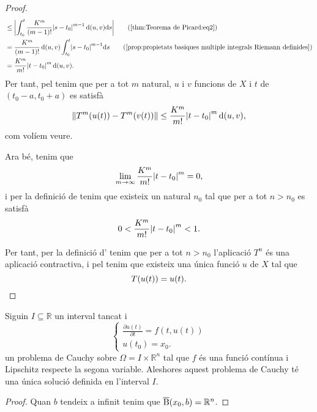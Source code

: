 \documentclass[../Apunts.tex]{subfiles}
\begin{document}
\begin{theorem}
\begin{proof}
\begin{align*}
				&\leq\abs{\int_{t_{0}}^{t}\frac{K^{m}}{(m-1)!}\abs{s-t_{0}}^{m-1}\distancia(u,v)\diff s}\tag{\ref{thm:Teorema de Picard:eq2}}\\
				&=\frac{K^{m}}{(m-1)!}\distancia(u,v)\int_{t_{0}}^{t}\abs{s-t_{0}}^{m-1}\diff s\tag{\ref{prop:propietats basiques multiple integrals Riemann definides}}\\
				&=\frac{K^{m}}{m!}\abs{t-t_{0}}^{m}\distancia(u,v).%
			\end{align*}
			Per tant, pel  tenim que per a tot \(m\) natural, \(u\) i \(v\) funcions de \(X\) i \(t\) de \((t_{0}-a,t_{0}+a)\) es satisfà
			\[\norm{T^{m}(u(t))-T^{m}(v(t))}\leq\frac{K^{m}}{m!}\abs{t-t_{0}}^{m}\distancia(u,v),\]
			com volíem veure.
			
			Ara bé, tenim que
			\[\lim_{m\to\infty}\frac{K^{m}}{m!}\abs{t-t_{0}}^{m}=0,\]%
			i per la definició de  tenim que existeix un natural \(n_{0}\) tal que per a tot \(n>n_{0}\) es satisfà
			\[0<{\frac{K^{m}}{m!}\abs{t-t_{0}}^{m}}<1.\]
			
			Per tant, per la definició d' tenim que per a tot \(n>n_{0}\) l'aplicació \(T^{n}\) és una aplicació contractiva, i pel \corollari{}  tenim que existeix una única funció \(u\) de \(X\) tal que
			\[T(u(t))=u(t).\qedhere\]
		\end{proof}
	\end{theorem}
	\begin{corollary}
		\label{cor:Teorema de Picard}
		Siguin \(I\subseteq\mathbb{R}\) un interval tancat i
		\[\begin{cases}
			\displaystyle \frac{\partial u(t)}{\partial t}=f(t,u(t)) \\
			\displaystyle u(t_{0})=x_{0}.
		\end{cases}\]
		un problema de Cauchy sobre \(\Omega=I\times\mathbb{R}^{n}\) tal que \(f\) és una funció contínua i Lipschitz respecte la segona variable. Aleshores aquest problema de Cauchy té una única solució definida en l'interval \(I\).
		\begin{proof}
			Quan \(b\) tendeix a infinit tenim que \(\overline{\operatorname{B}}(x_{0},b)=\mathbb{R}^{n}\).
		\end{proof}
	\end{corollary}
\end{document}
